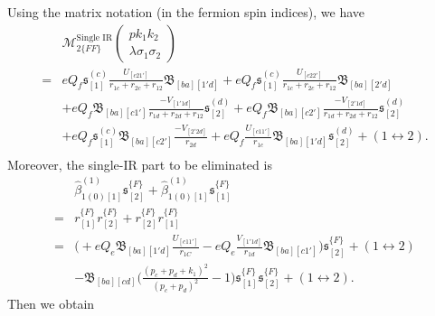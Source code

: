 Using the matrix notation (in the fermion spin indices), we have
\begin{align}
&\mathcal{M}^\text{Single IR}_{2\{FF\}}\left(\begin{array}{c}
pk_1k_2\\\lambda\sigma_1\sigma_2
\end{array}\right)\nonumber\\
=&eQ_f\mathfrak{s}_{[1]}^{(c)}\frac{U_{[c21']}}{r_{1c}+r_{2c}+r_{12}}\mathfrak{B}_{[ba][1'd]}+eQ_f\mathfrak{s}_{[1]}^{(c)}\frac{U_{[c22']}}{r_{1c}+r_{2c}+r_{12}}\mathfrak{B}_{[ba][2'd]}\nonumber\\
&+eQ_f\mathfrak{B}_{[ba][c1']}\frac{-V_{[1'1d]}}{r_{1d}+r_{2d}+r_{12}}\mathfrak{s}^{(d)}_{[2]}+eQ_f\mathfrak{B}_{[ba][c2']}\frac{-V_{[2'1d]}}{r_{1d}+r_{2d}+r_{12}}\mathfrak{s}^{(d)}_{[2]}\nonumber\\
&+eQ_f\mathfrak{s}^{(c)}_{[1]}\mathfrak{B}_{[ba][c2']}\frac{-V_{[2'2d]}}{r_{2d}}+eQ_f\frac{U_{[c11']}}{r_{1c}}\mathfrak{B}_{[ba][1'd]}\mathfrak{s}^{(d)}_{[2]}+(1\leftrightarrow 2).\nonumber\\
\end{align}
Moreover, the single-IR part to be eliminated is 
\begin{align}
&\hat{\beta}^{(1)}_{1(0)[1]}\mathfrak{s}^{\{F\}}_{[2]}+\hat{\beta}^{(1)}_{1(0)[1]}\mathfrak{s}^{\{F\}}_{[1]}\nonumber\\
=&r^{\{F\}}_{[1]}r^{\{F\}}_{[2]}+r^{\{F\}}_{[2]}r^{\{F\}}_{[1]}\nonumber\\
=&\biggl( +eQ_e\mathfrak{B}_{[ba][1'd]}\frac{U_{[c11']}}{r_{1C}}-eQ_e\frac{V_{[1'1d]}}{r_{1d}}\mathfrak{B}_{[ba][c1']} \biggr)\mathfrak{s}^{\{F\}}_{[2]}+(1\leftrightarrow 2)\nonumber\\
&-\mathfrak{B}_{[ba][cd]}\biggl( \frac{(p_c+p_d+k_1)^2}{(p_c+p_d)^2}-1 \biggr)\mathfrak{s}^{\{F\}}_{[1]}\mathfrak{s}^{\{F\}}_{[2]}+(1\leftrightarrow 2).
\end{align}
Then we obtain
